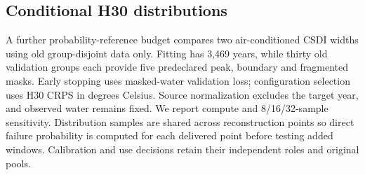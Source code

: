 \subsection{Conditional H30 distributions}

A further probability-reference budget compares two air-conditioned CSDI widths using old group-disjoint data only. Fitting has 3,469 years, while thirty old validation groups each provide five predeclared peak, boundary and fragmented masks. Early stopping uses masked-water validation loss; configuration selection uses H30 CRPS in degrees Celsius. Source normalization excludes the target year, and observed water remains fixed. We report compute and 8/16/32-sample sensitivity. Distribution samples are shared across reconstruction points so direct failure probability is computed for each delivered point before testing added windows. Calibration and use decisions retain their independent roles and original pools.
